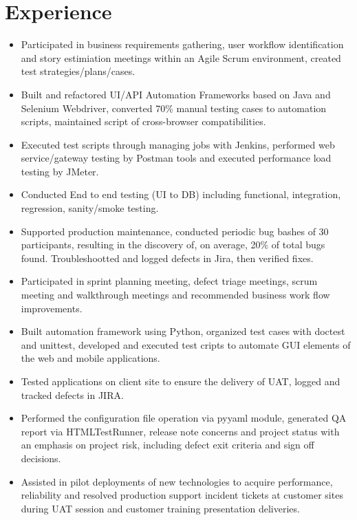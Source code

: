 \documentclass{resume}
\begin{document}
\section{Experience}
\begin{itemize}
  \item Participated in business requirements gathering, user workflow identification and story estimiation meetings within an Agile Scrum environment, created test strategies/plans/cases.
  \item Built and refactored UI/API Automation Frameworks based on Java and Selenium Webdriver, converted 70\% manual testing cases to automation scripts, maintained script of cross-browser compatibilities.
  \item Executed test scripts through managing jobs with Jenkins, performed web service/gateway testing by Postman tools and executed performance load testing by JMeter.
  \item Conducted End to end testing (UI to DB) including functional, integration, regression, sanity/smoke testing. 
  \item Supported production maintenance, conducted periodic bug bashes of 30 participants, resulting in the discovery of, on average, 20\% of total bugs found. Troubleshootted and logged defects in Jira, then verified fixes.
\end{itemize}

\begin{itemize}
  \item Participated in sprint planning meeting, defect triage meetings, scrum meeting and walkthrough meetings and recommended business work flow improvements.
  \item Built automation framework using Python, organized test cases with doctest and unittest, developed and executed test cripts to automate GUI elements of the web and mobile applications.
  \item Tested applications on client site to ensure the delivery of UAT, logged and tracked defects in JIRA.
  \item Performed the configuration file operation via pyyaml module, generated QA report via HTMLTestRunner, release note concerns and project status with an emphasis on project risk, including defect exit criteria and sign off decisions.
  \item Assisted in pilot deployments of new technologies to acquire performance, reliability and resolved production support incident tickets at customer sites during UAT session and customer training presentation deliveries.  
\end{itemize}
\end{document}
